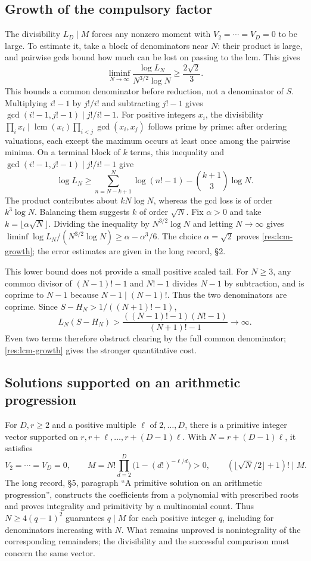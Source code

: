 \documentclass[11pt]{article}
\begin{document}
\subsection{Growth of the compulsory factor}
The divisibility $L_D\mid M$ forces any nonzero moment with
$V_2=\cdots=V_D=0$ to be large. To estimate
it, take a block of denominators near $N$: their product is large, and
pairwise gcds bound how much can be lost on passing to the lcm. This gives
\begin{equation}
\liminf_{N\to\infty}\frac{\log L_N}{N^{3/2}\log N}
\ge\frac{2\sqrt2}{3}.\label{res:lcm-growth}
\end{equation}
This bounds a common denominator before reduction, not a denominator
of $S$. Multiplying $i!-1$ by $j!/i!$ and subtracting $j!-1$ gives
$\gcd(i!-1,j!-1)\mid j!/i!-1$. For positive integers $x_i$, the divisibility
$\prod_i x_i\mid\operatorname{lcm}(x_i)\prod_{i<j}\gcd(x_i,x_j)$
follows prime by prime: after ordering valuations, each except the maximum
occurs at least once among the pairwise minima.  On a terminal block of $k$
terms, this inequality and
$\gcd(i!-1,j!-1)\mid j!/i!-1$ give
\[
\log L_N\ge\sum_{n=N-k+1}^N\log(n!-1)
-\binom{k+1}{3}\log N.
\]
The product contributes about $kN\log N$, whereas the gcd loss is of
order $k^3\log N$. Balancing them suggests $k$ of order $\sqrt N$.
Fix $\alpha>0$ and take $k=\lfloor\alpha\sqrt N\rfloor$. Dividing the
inequality by $N^{3/2}\log N$ and letting $N\to\infty$ gives
$\liminf \log L_N/(N^{3/2}\log N)\ge\alpha-\alpha^3/6$.
The choice $\alpha=\sqrt2$ proves \eqref{res:lcm-growth}; the error estimates
are given in the long record, \S2.

This lower bound does not provide a small positive scaled tail.  For $N\ge3$, any common divisor
of $(N-1)!-1$ and $N!-1$ divides $N-1$ by subtraction, and is coprime to
$N-1$ because $N-1\mid(N-1)!$.  Thus the two denominators are coprime.
Since $S-H_N>1/((N+1)!-1)$,
\[
 L_N(S-H_N)>
 \frac{((N-1)!-1)(N!-1)}{(N+1)!-1}\longrightarrow\infty.
\]
Even two terms therefore obstruct clearing by the full common denominator;
\eqref{res:lcm-growth} gives the stronger quantitative cost.

\subsection{Solutions supported on an arithmetic progression}\label{sec:compressed-kernel}
For $D,r\ge2$ and a positive multiple $\ell$ of $2,\ldots,D$, there is a
primitive integer vector supported on $r,r+\ell,\ldots,r+(D-1)\ell$. With
$N=r+(D-1)\ell$, it satisfies
\[
 V_2=\cdots=V_D=0,\qquad
 M=N!\prod_{d=2}^D\bigl(1-(d!)^{-\ell/d}\bigr)>0,
 \qquad (\lfloor\sqrt N/2\rfloor+1)!\mid M.
\]
The long record, \S5, paragraph ``A primitive solution on an arithmetic
progression'', constructs the coefficients from a polynomial with prescribed roots
and proves integrality and primitivity by a multinomial count.
Thus $N\ge4(q-1)^2$ guarantees $q\mid M$ for each positive integer $q$, including for denominators increasing
with $N$. What remains unproved is nonintegrality of the corresponding
remainders; the divisibility and the successful comparison must concern
the same vector.
\end{document}
